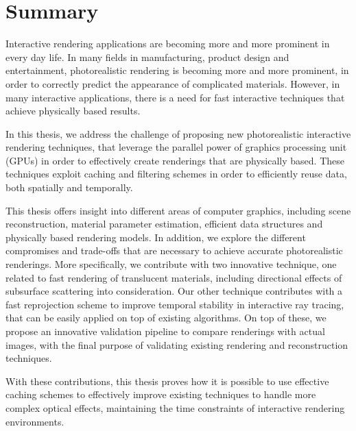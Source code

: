 \chapter{Summary}

Interactive rendering applications are becoming more and more prominent in every day life. In many fields in manufacturing, product design and entertainment, photorealistic rendering is becoming more and more prominent, in order to correctly predict the appearance of complicated materials. However, in many interactive applications, there is a need for fast interactive techniques that achieve physically based results. 

In this thesis, we address the challenge of proposing new photorealistic interactive rendering techniques, that leverage the parallel power of graphics processing unit (GPUs) in order to effectively create renderings that are physically based. These techniques exploit caching and filtering schemes in order to efficiently reuse data, both spatially and temporally.     
 
This thesis offers insight into different areas of computer graphics, including scene reconstruction, material parameter estimation, efficient data structures and physically based rendering models. In addition, we explore the different compromises and trade-offs that are necessary to achieve accurate photorealistic renderings. More specifically, we contribute with two innovative technique, one related to fast rendering of translucent materials, including directional effects of subsurface scattering into consideration. Our other technique contributes with a fast reprojection scheme to improve temporal stability in interactive ray tracing, that can be easily applied on top of existing algorithms. On top of these, we propose an innovative validation pipeline to compare renderings with actual images, with the final purpose of validating existing rendering and reconstruction techniques. 

With these contributions, this thesis proves how it is possible to use effective caching schemes to effectively improve existing techniques to handle more complex optical effects, maintaining the time constraints of interactive rendering environments.
